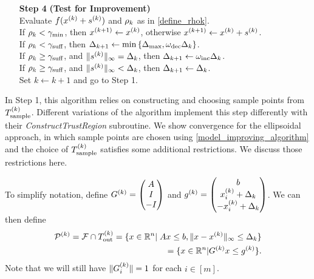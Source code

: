 \documentclass{article}
\begin{document}
{\begin{fullwidth}[leftmargin=0in, rightmargin=0in, width=\linewidth-0.5in]
\begin{flushleft}
\begin{algorithm}[H]
\begin{itemize}
 		\end{itemize}
 		\end{algorithm}
 		
 		\newpage
 		
 		\begin{algorithm}[H]
 		\begin{itemize}
 		
        \item[\textbf{Step 4}] \textbf{(Test for Improvement)} \\
            Evaluate $f(x^{(k)} + {{s}^{(k)}})$ and $\rho_k$ as in \cref{define_rhok}. \\
			If $\rho_k < \gamma_{\textrm{min}}$, then ${{x}^{(k+1)}} \gets x^{(k)}$, otherwise ${{x}^{(k+1)}} \gets x^{(k)} + {{s}^{(k)}}$. \\
            If $\rho_k < \gamma_{\textrm{suff}}$, then $\Delta_{k+1} \gets \min\left\{{\Delta_{\textrm{max}}}, \omega_{\text{dec}}\Delta_k\right\}$. \\
            If $\rho_k \ge \gamma_{\textrm{suff}}$, and $\|{{s}^{(k)}}\|_{\infty} = \Delta_k$, then $\Delta_{k+1} \gets \omega_{\text{inc}}\Delta_k$. \\
            If $\rho_k \ge \gamma_{\textrm{suff}}$, and $\|{{s}^{(k)}}\|_{\infty} < \Delta_k$, then $\Delta_{k+1} \gets \Delta_k$. \\
            Set $k \gets k+1$ and go to Step 1.
    \end{itemize}
\end{algorithm}

\end{flushleft}
\end{fullwidth}
}


In Step 1, this algorithm relies on constructing and choosing sample points from ${T_{\text{sample}}^{(k)}}$.
Different variations of the algorithm implement this step differently with their \emph{ConstructTrustRegion} subroutine.
We show convergence for the ellipsoidal approach, in which sample points are chosen using \cref{model_improving_algorithm}
and the choice of ${T_{\text{sample}}^{(k)}}$ satisfies some additional restrictions.
We discuss those restrictions here.

To simplify notation, define $G^{(k)} = \begin{pmatrix} {A} \\ I \\ -I \end{pmatrix}$ and 
${g^{(k)}} = \begin{pmatrix} {b} \\ x_i^{(k)}+\Delta_k \\ -x_i^{(k)}+\Delta_k \end{pmatrix}$.
We can then define
\begin{align}
{{\mathcal{P}}^{(k)}} = {\mathcal F} \cap {T_{\text{out}}^{(k)}} =  \{x \in \mathbb R^n | \; {A} x \le {b}, \|x - x^{(k)}\|_{\infty} \le \Delta_k \} \label{polyhedron_k}  \\
= \{x \in \mathbb R^n | G^{(k)} x \le {g^{(k)}} \}. \nonumber
\end{align}
Note that we will still have $\|G^{(k)}_i\| = 1$ for each $i \in [m]$.
\end{document}
